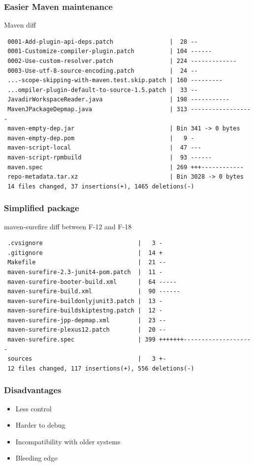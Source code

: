 \documentclass[pdftex,unicode,xcolor=table]{beamer}
\begin{document}
\begin{frame}[fragile]
  \frametitle{Easier Maven maintenance}
  \begin{block}{Maven diff}
    \scriptsize
\begin{verbatim}
 0001-Add-plugin-api-deps.patch                |  28 --
 0001-Customize-compiler-plugin.patch          | 104 ------
 0002-Use-custom-resolver.patch                | 224 -------------
 0003-Use-utf-8-source-encoding.patch          |  24 --
 ...-scope-skipping-with-maven.test.skip.patch | 160 ---------
 ...ompiler-plugin-default-to-source-1.5.patch |  33 --
 JavadirWorkspaceReader.java                   | 198 -----------
 MavenJPackageDepmap.java                      | 313 ------------------
 maven-empty-dep.jar                           | Bin 341 -> 0 bytes
 maven-empty-dep.pom                           |   9 -
 maven-script-local                            |  47 ---
 maven-script-rpmbuild                         |  93 ------
 maven.spec                                    | 269 +++------------
 repo-metadata.tar.xz                          | Bin 3028 -> 0 bytes
 14 files changed, 37 insertions(+), 1465 deletions(-)
\end{verbatim}
  \end{block}
\end{frame}

\begin{frame}[fragile]
  \frametitle{Simplified package}
  \begin{block}{maven-surefire diff between F-12 and F-18}
    \scriptsize
\begin{verbatim}
 .cvsignore                           |   3 -
 .gitignore                           |  14 +
 Makefile                             |  21 --
 maven-surefire-2.3-junit4-pom.patch  |  11 -
 maven-surefire-booter-build.xml      |  64 -----
 maven-surefire-build.xml             |  90 ------
 maven-surefire-buildonlyjunit3.patch |  13 -
 maven-surefire-buildskiptestng.patch |  12 -
 maven-surefire-jpp-depmap.xml        |  23 --
 maven-surefire-plexus12.patch        |  20 --
 maven-surefire.spec                  | 399 +++++++--------------------
 sources                              |   3 +-
 12 files changed, 117 insertions(+), 556 deletions(-)
\end{verbatim}
  \end{block}
\end{frame}

\begin{frame}
  \frametitle{Disadvantages}
  \begin{itemize}
    \item Less control
    \item Harder to debug
    \item Incompatibility with older systems
    \item Bleeding edge
  \end{itemize}
\end{frame}
\end{document}
